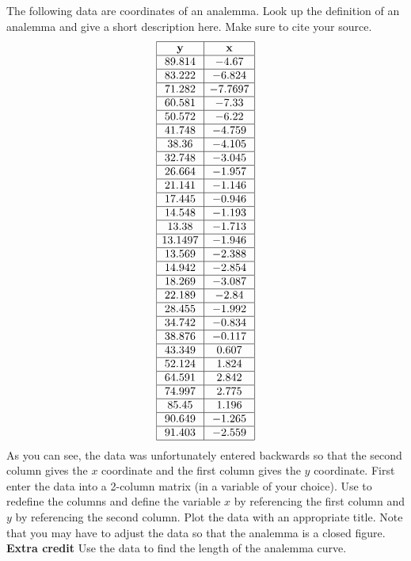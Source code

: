 {The following data are coordinates of an analemma.  Look up the definition of an analemma and give a short description here.  Make sure to cite your source.  
\[
\begin{array}{|c|c|}
\hline
{\bf y} & {\bf x} \\ \hline
89.814&	-4.67\\ \hline
83.222&	-6.824\\ \hline
71.282&	-7.7697\\ \hline
60.581&	-7.33\\ \hline
50.572&	-6.22\\ \hline
41.748&	-4.759\\ \hline
38.36	&-4.105\\ \hline
32.748&	-3.045\\ \hline
26.664&	-1.957\\ \hline
21.141&	-1.146\\ \hline
17.445&	-0.946\\ \hline
14.548&	-1.193\\ \hline
13.38	&-1.713\\ \hline
13.1497&	-1.946\\ \hline
13.569&	-2.388\\ \hline
14.942&	-2.854\\ \hline
18.269&	-3.087\\ \hline
22.189&	-2.84\\ \hline
28.455&	-1.992\\ \hline
34.742&	-0.834\\ \hline
38.876&	-0.117\\ \hline
43.349&	0.607\\ \hline
52.124&	1.824\\ \hline
64.591&	2.842\\ \hline
74.997&	2.775\\ \hline
85.45&	1.196\\ \hline
90.649&	-1.265\\ \hline
91.403& 	-2.559\\
\hline
\end{array}
\]
As you can see, the data was unfortunately entered backwards so that the second column gives the $x$ coordinate and the first column gives the $y$ coordinate.  
First enter the data into a 2-column matrix (in a variable of your choice).  Use  to redefine the columns and define the variable $x$ by referencing the first column and $y$ by referencing the second column.  Plot the data with an appropriate title.  Note that you may have to adjust the data so that the analemma is a closed figure.\\


{\bf Extra credit} Use the data to find the length of the analemma curve.}
{}

